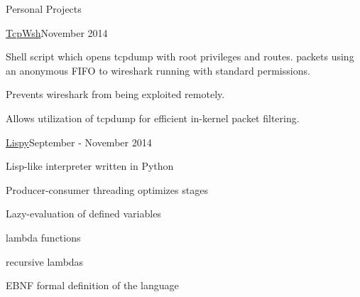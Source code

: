 \documentclass{resume} %
\begin{document}
\begin{rSection}{Personal Projects}

	\begin{rSubsection}{\href{http://github.com/cptaffe/tcpwsh}{TcpWsh}}{November 2014}{}{}

	\item Shell script which opens tcpdump with root privileges and routes. packets using an anonymous FIFO to wireshark running with standard permissions.
	\item Prevents wireshark from being exploited remotely.
	\item Allows utilization of tcpdump for efficient in-kernel packet filtering.
\end{rSubsection}

\begin{rSubsection}{\href{http://github.com/cptaffe/lispy}{Lispy}}{September - November 2014}{}{}

	\item Lisp-like interpreter written in Python
	\item Producer-consumer threading optimizes stages
	\item Lazy-evaluation of defined variables
	\item lambda functions
	\item recursive lambdas
	\item EBNF formal definition of the language
\end{rSubsection}

\end{rSection}

\end{document}
